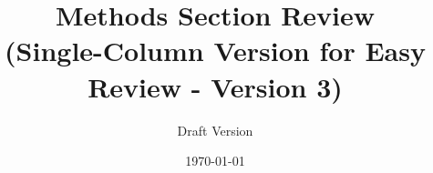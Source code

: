 \documentclass[12pt,a4paper]{article}
\begin{document}
\title{Methods Section Review\\
\large (Single-Column Version for Easy Review - Version 3)}
\author{Draft Version}
\date{\today}
\maketitle
\setcounter{section}{1}  %



\end{document}

